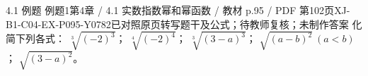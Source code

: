 \par\noindent\begin{minipage}{\linewidth}
\begin{bankitem}{4.1 例题 例题1}{第4章 / 4.1 实数指数幂和幂函数 / 教材 p.95 / PDF 第102页}{XJ-B1-C04-EX-P095-Y0782}{已对照原页转写题干及公式；待教师复核；未制作答案}
化简下列各式：
$\sqrt[3]{(-2)^3}$；
$\sqrt[4]{(-2)^4}$；
$\sqrt[3]{(3-a)^3}$；
$\sqrt{(a-b)^2}\ (a<b)$；
$\sqrt{(3-a)^2}$。
\end{bankitem}
\end{minipage}\par\medskip
